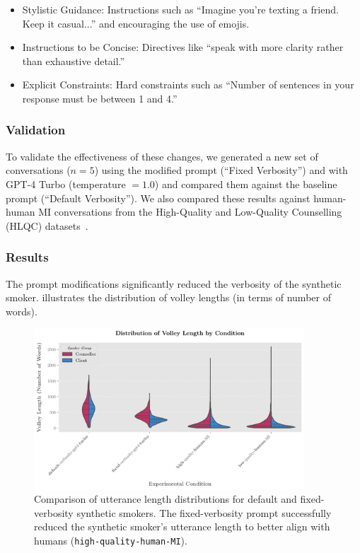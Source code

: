 \begin{itemize}
	\item Stylistic Guidance: Instructions such as ``Imagine you're texting a friend. Keep it
	      casual...'' and encouraging the use of emojis.
	\item Instructions to be Concise: Directives like ``speak with more clarity rather than
	      exhaustive detail.''
	\item Explicit Constraints: Hard constraints such as ``Number of sentences in your response
	      must be between 1 and 4.''
\end{itemize}

\subsubsection{Validation}
To validate the effectiveness of these changes, we generated a new set of conversations
($n=5$) using the modified prompt (``Fixed Verbosity'') and with GPT-4 Turbo
(temperature $=1.0$) and compared them against the baseline prompt (``Default
Verbosity''). We also compared these results against human-human MI conversations from
the High-Quality and Low-Quality Counselling (HLQC)
datasets~\citep{perez-rosas-etal-2019-makes}.

\subsubsection{Results}
The prompt modifications significantly reduced the verbosity of the synthetic smoker.
 illustrates the distribution of volley lengths (in
terms of number of words).

\begin{figure}[htpb]
	\centering
	\includegraphics[width=0.9\textwidth]{fig/utterance_length_violin_plot.pdf}
	\caption[Distribution of volley length for default and fixed-verbosity synthetic smokers]{Comparison of utterance length distributions for default and fixed-verbosity synthetic smokers. The fixed-verbosity prompt successfully reduced the synthetic smoker's utterance length to better align with humans (\texttt{high-quality-human-MI}).}
	\label{fig:verbosity-comparison}
\end{figure}

